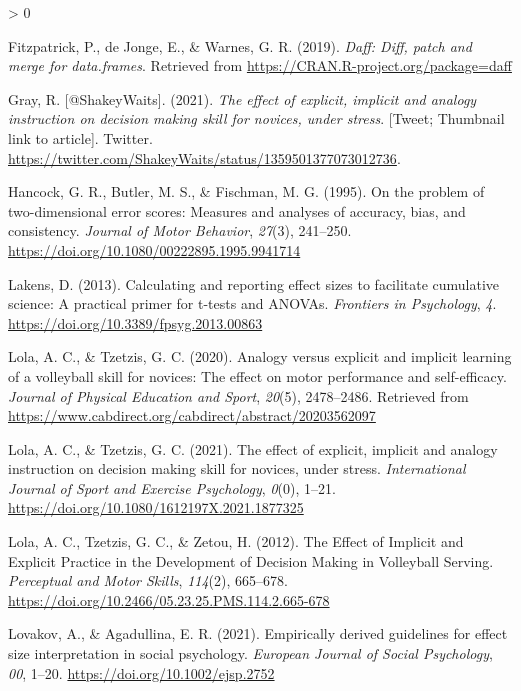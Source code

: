 \documentclass[
  english,
  man,floatsintext]{apa7}
\newlength{\cslhangindent}
\newenvironment{CSLReferences}[2] %
 {%
  \setlength{\parindent}{0pt}
  \ifodd #1 \everypar{\setlength{\hangindent}{\cslhangindent}}\ignorespaces\fi
  \ifnum #2 > 0
  \setlength{\parskip}{#2\baselineskip}
  \fi
 }%
 {}
\begin{document}
\begin{CSLReferences}{1}{0}
\leavevmode\hypertarget{ref-R-daff}{}%
Fitzpatrick, P., de Jonge, E., \& Warnes, G. R. (2019). \emph{Daff: Diff, patch and merge for data.frames}. Retrieved from \url{https://CRAN.R-project.org/package=daff}

\leavevmode\hypertarget{ref-gray2021}{}%
Gray, R. {[}@ShakeyWaits{]}. (2021). \emph{The effect of explicit, implicit and analogy instruction on decision making skill for novices, under stress}. {[}Tweet; Thumbnail link to article{]}. Twitter. \url{https://twitter.com/ShakeyWaits/status/1359501377073012736}.

\leavevmode\hypertarget{ref-hancock1995}{}%
Hancock, G. R., Butler, M. S., \& Fischman, M. G. (1995). On the problem of two-dimensional error scores: Measures and analyses of accuracy, bias, and consistency. \emph{Journal of Motor Behavior}, \emph{27}(3), 241--250. \url{https://doi.org/10.1080/00222895.1995.9941714}

\leavevmode\hypertarget{ref-lakens2013}{}%
Lakens, D. (2013). Calculating and reporting effect sizes to facilitate cumulative science: A practical primer for t-tests and ANOVAs. \emph{Frontiers in Psychology}, \emph{4}. \url{https://doi.org/10.3389/fpsyg.2013.00863}

\leavevmode\hypertarget{ref-lola2020}{}%
Lola, A. C., \& Tzetzis, G. C. (2020). Analogy versus explicit and implicit learning of a volleyball skill for novices: The effect on motor performance and self-efficacy. \emph{Journal of Physical Education and Sport}, \emph{20}(5), 2478--2486. Retrieved from \url{https://www.cabdirect.org/cabdirect/abstract/20203562097}

\leavevmode\hypertarget{ref-lola2021}{}%
Lola, A. C., \& Tzetzis, G. C. (2021). The effect of explicit, implicit and analogy instruction on decision making skill for novices, under stress. \emph{International Journal of Sport and Exercise Psychology}, \emph{0}(0), 1--21. \url{https://doi.org/10.1080/1612197X.2021.1877325}

\leavevmode\hypertarget{ref-lola2012}{}%
Lola, A. C., Tzetzis, G. C., \& Zetou, H. (2012). The Effect of Implicit and Explicit Practice in the Development of Decision Making in Volleyball Serving. \emph{Perceptual and Motor Skills}, \emph{114}(2), 665--678. \url{https://doi.org/10.2466/05.23.25.PMS.114.2.665-678}

\leavevmode\hypertarget{ref-lovakov2021}{}%
Lovakov, A., \& Agadullina, E. R. (2021). Empirically derived guidelines for effect size interpretation in social psychology. \emph{European Journal of Social Psychology}, \emph{00}, 1--20. \url{https://doi.org/10.1002/ejsp.2752}


\end{CSLReferences}
\end{document}
